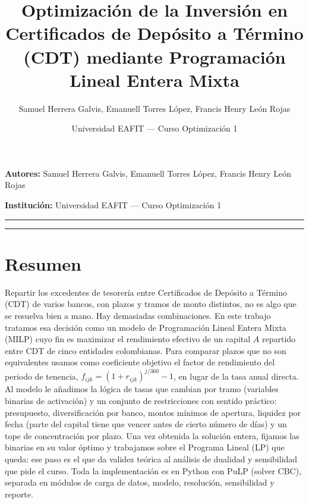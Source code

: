 \documentclass[11pt,a4paper]{article}
\title{Optimización de la Inversión en Certificados de Depósito a Término (CDT) mediante Programación Lineal Entera Mixta}
\author{Samuel Herrera Galvis, Emanuell Torres López, Francis Henry León Rojas}
\date{Universidad EAFIT --- Curso Optimización 1}
\begin{document}
\maketitle

\noindent\textbf{Autores:} Samuel Herrera Galvis, Emanuell Torres López, Francis Henry León Rojas

\medskip
\noindent\textbf{Institución:} Universidad EAFIT --- Curso Optimización 1

\bigskip
\hrule
\bigskip

\tableofcontents

\bigskip
\hrule
\bigskip

\section{Resumen}

Repartir los excedentes de tesorería entre Certificados de Depósito a
Término (CDT) de varios bancos, con plazos y tramos de monto distintos, no es algo
que se resuelva bien a mano. Hay demasiadas combinaciones. En este trabajo tratamos esa
decisión como un modelo de Programación Lineal Entera Mixta (MILP) cuyo fin es
maximizar el rendimiento efectivo de un capital $A$ repartido entre CDT de cinco
entidades colombianas. Para comparar plazos que no son equivalentes usamos como
coeficiente objetivo el factor de rendimiento del periodo de tenencia,
$f_{ijk} = (1 + r_{ijk})^{j/360} - 1$, en lugar de la tasa anual directa. Al modelo le
añadimos la lógica de tasas que cambian por tramo (variables binarias de activación) y un
conjunto de restricciones con sentido práctico: presupuesto, diversificación por banco,
montos mínimos de apertura, liquidez por fecha (parte del capital tiene que vencer antes
de cierto número de días) y un tope de concentración por plazo. Una vez obtenida la
solución entera, fijamos las binarias en su valor óptimo y trabajamos sobre el Programa
Lineal (LP) que queda: ese paso es el que da validez teórica al análisis de dualidad y
sensibilidad que pide el curso. Toda la implementación es en Python con PuLP (solver CBC),
separada en módulos de carga de datos, modelo, resolución, sensibilidad y reporte.
\end{document}

